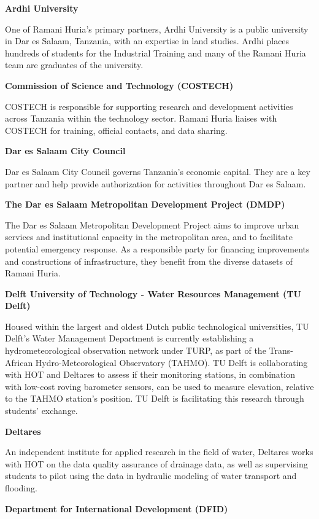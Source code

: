 \documentclass[a4paper,12pt,twoside]{article}
\begin{document}
\textbf{Ardhi University}

One of Ramani Huria’s primary partners, Ardhi University is a public university in Dar es Salaam, Tanzania, with an expertise in land studies. Ardhi places hundreds of students for the Industrial Training and many of the Ramani Huria team are graduates of the university.

\textbf{Commission of Science and Technology (COSTECH)}


COSTECH is responsible for supporting research and development activities across Tanzania within the technology sector. Ramani Huria liaises with COSTECH for training, official contacts, and data sharing.

\textbf{Dar es Salaam City Council}


Dar es Salaam City Council governs Tanzania’s economic capital. They are a key partner and help provide authorization for activities throughout Dar es Salaam. 

\textbf{The Dar es Salaam Metropolitan Development Project (DMDP)}


The Dar es Salaam Metropolitan Development Project aims to improve urban services and institutional capacity in the metropolitan area, and to facilitate potential emergency response. As a responsible party for financing improvements and constructions of infrastructure, they benefit from the diverse datasets of Ramani Huria. 

\textbf{Delft University of Technology - Water Resources Management (TU Delft)}


Housed within the largest and oldest Dutch public technological universities, TU Delft's Water Management Department is currently establishing a hydrometeorological observation network under TURP, as part of the Trans-African Hydro-Meteorological Observatory (TAHMO). TU Delft is collaborating with HOT and Deltares to assess if their monitoring stations, in combination with low-cost roving barometer sensors, can be used to measure elevation, relative to the TAHMO station's position. TU Delft is facilitating this research through students’ exchange. 

\textbf{Deltares}


An independent institute for applied research in the field of water, Deltares works with HOT on the data quality assurance of drainage data, as well as supervising students to pilot using the data in hydraulic modeling of water transport and flooding. 

\textbf{Department for International Development (DFID)}
\end{document}
